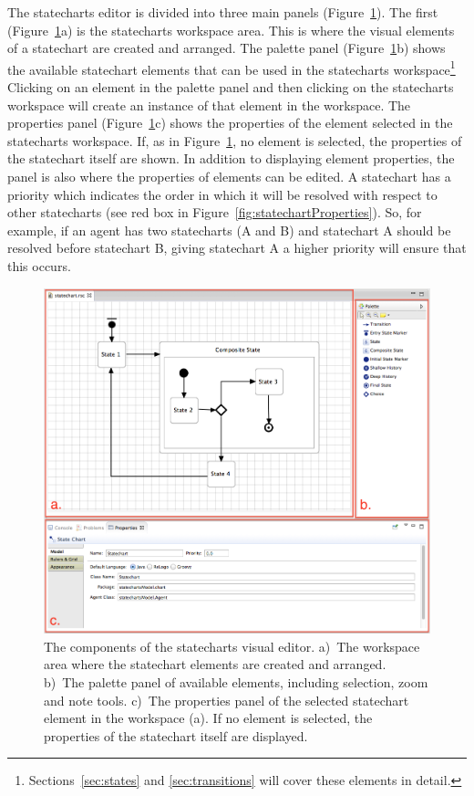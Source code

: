 \documentclass[11pt]{amsart}
\begin{document}
The statecharts editor is divided into three main panels (Figure~\ref{fig:statechartEditorBoxes}). The first (Figure~\ref{fig:statechartEditorBoxes}a) is the statecharts workspace area. This is where the visual elements of a statechart are created and arranged. The palette panel (Figure~\ref{fig:statechartEditorBoxes}b) shows the available statechart elements that can be used in the statecharts workspace\footnote{Sections~\ref{sec:states} and \ref{sec:transitions} will cover these elements in detail.} Clicking on an element in the palette panel and then clicking on the statecharts workspace will create an instance of that element in the workspace. The properties panel (Figure~\ref{fig:statechartEditorBoxes}c) shows the properties of the element selected in the statecharts workspace. If, as in Figure~\ref{fig:statechartEditorBoxes}, no element is selected, the properties of the statechart itself are shown. In addition to displaying element properties, the panel is also where the properties of elements can be edited. A statechart has a priority which indicates the order in which it will be resolved with respect to other statecharts (see red box in Figure~\ref{fig:statechartProperties}). So, for example, if an agent has two statecharts (A and B) and statechart A should be resolved before statechart B, giving statechart A a higher priority will ensure that this occurs.
\begin{figure}
\begin{center}
\vspace{.2in}
\centerline {
\includegraphics[width=5in]{StatechartsImages/StatechartEditorBoxes.png}
}
\caption{The components of the statecharts visual editor. a)~The workspace area where the statechart elements are created and arranged. b)~The palette panel of available elements, including selection, zoom and note tools. c)~The properties panel of the selected statechart element in the workspace (a). If no element is selected, the properties of the statechart itself are displayed.}
\label{fig:statechartEditorBoxes}
\end{center}
\end{figure}
\end{document}
